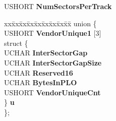 \begin{DoxyCompactItemize}
\mbox{\label{struct___e_x_t_e_n_d_e_d___i_d_e_n_t_i_f_y___d_a_t_a_a9688eb59f13637d2389d6a2153d1ef77}} 
U\+S\+H\+O\+RT {\bfseries Num\+Sectors\+Per\+Track}
\item 
\mbox{\label{struct___e_x_t_e_n_d_e_d___i_d_e_n_t_i_f_y___d_a_t_a_acc4550406a4daa788f8f1df3b87cf056}} 
\begin{tabbing}
xx\=xx\=xx\=xx\=xx\=xx\=xx\=xx\=xx\=\kill
union \{\\
\>USHORT {\bfseries VendorUnique1} \mbox{[}3\mbox{]}\\
\>struct \{\\
\>\>UCHAR {\bfseries InterSectorGap}\\
\>\>UCHAR {\bfseries InterSectorGapSize}\\
\>\>UCHAR {\bfseries Reserved16}\\
\>\>UCHAR {\bfseries BytesInPLO}\\
\>\>USHORT {\bfseries VendorUniqueCnt}\\
\>\} {\bfseries u}\\
\}; \\


\end{tabbing}
\end{DoxyCompactItemize}
